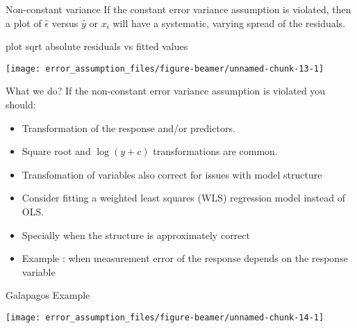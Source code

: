 \begin{frame}{Non-constant variance}
\protect\hypertarget{non-constant-variance}{}
If the constant error variance assumption is violated, then a plot of
\(\hat{\epsilon}\) versus \(\hat{y}\) or \(x_i\) will have a systematic,
varying spread of the residuals.
\end{frame}

\begin{frame}[fragile]{plot sqrt absolute residuals vs fitted values}
\protect\hypertarget{plot-sqrt-absolute-residuals-vs-fitted-values}{}
\begin{Shaded}
\begin{Highlighting}[]
 \NormalTok{)}
\end{Highlighting}
\end{Shaded}

\begin{center}\texttt{[image: error\_assumption\_files/figure-beamer/unnamed-chunk-13-1]} \end{center}
\end{frame}

\begin{frame}{What we do?}
\protect\hypertarget{what-we-do}{}
If the non-constant error variance assumption is violated you should:

\begin{itemize}
\item
  Transformation of the response and/or predictors.
\item
  Square root and \(\log(y+c)\) transformations are common.
\item
  Transfomation of variables also correct for issues with model
  structure
\item
  Consider fitting a weighted least squares (WLS) regression model
  instead of OLS.
\item
  Specially when the structure is approximately correct
\item
  Example : when measurement error of the response depends on the
  response variable
\end{itemize}
\end{frame}

\begin{frame}{Galapagos Example}
\protect\hypertarget{galapagos-example}{}
\begin{center}\texttt{[image: error\_assumption\_files/figure-beamer/unnamed-chunk-14-1]} \end{center}
\end{frame}

